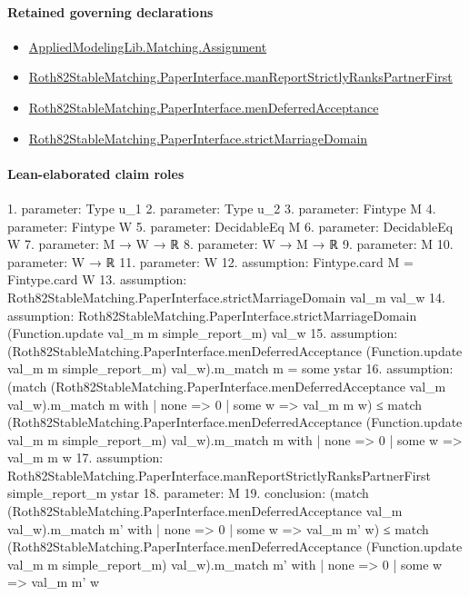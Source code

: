 \documentclass[10pt]{article}
\begin{document}
\paragraph{Retained governing declarations}
\begin{itemize}\raggedright
\item \hyperlink{governing-declaration-508c084086b006b8}{Applied\allowbreak{}Modeling\allowbreak{}Lib.\allowbreak{}Matching.\allowbreak{}Assignment}
\item \hyperlink{paper-prerequisite-bcdb1d603a6bc29f}{Roth82\allowbreak{}Stable\allowbreak{}Matching.\allowbreak{}Paper\allowbreak{}Interface.\allowbreak{}man\allowbreak{}Report\allowbreak{}Strictly\allowbreak{}Ranks\allowbreak{}Partner\allowbreak{}First}
\item \hyperlink{governing-declaration-7357e0557237bc7e}{Roth82\allowbreak{}Stable\allowbreak{}Matching.\allowbreak{}Paper\allowbreak{}Interface.\allowbreak{}men\allowbreak{}Deferred\allowbreak{}Acceptance}
\item \hyperlink{governing-declaration-d06ec2a2987f0c72}{Roth82\allowbreak{}Stable\allowbreak{}Matching.\allowbreak{}Paper\allowbreak{}Interface.\allowbreak{}strict\allowbreak{}Marriage\allowbreak{}Domain}
\end{itemize}
\paragraph{Lean-elaborated claim roles}\begin{ReviewVerbatim}
1. parameter: Type u_1
2. parameter: Type u_2
3. parameter: Fintype M
4. parameter: Fintype W
5. parameter: DecidableEq M
6. parameter: DecidableEq W
7. parameter: M → W → ℝ
8. parameter: W → M → ℝ
9. parameter: M
10. parameter: W → ℝ
11. parameter: W
12. assumption: Fintype.card M = Fintype.card W
13. assumption: Roth82StableMatching.PaperInterface.strictMarriageDomain val_m val_w
14. assumption: Roth82StableMatching.PaperInterface.strictMarriageDomain (Function.update val_m m simple_report_m) val_w
15. assumption: (Roth82StableMatching.PaperInterface.menDeferredAcceptance (Function.update val_m m simple_report_m) val_w).m_match m =
  some ystar
16. assumption: (match (Roth82StableMatching.PaperInterface.menDeferredAcceptance val_m val_w).m_match m with
  | none => 0
  | some w => val_m m w) ≤
  match
    (Roth82StableMatching.PaperInterface.menDeferredAcceptance (Function.update val_m m simple_report_m) val_w).m_match
      m with
  | none => 0
  | some w => val_m m w
17. assumption: Roth82StableMatching.PaperInterface.manReportStrictlyRanksPartnerFirst simple_report_m ystar
18. parameter: M
19. conclusion: (match (Roth82StableMatching.PaperInterface.menDeferredAcceptance val_m val_w).m_match m' with
  | none => 0
  | some w => val_m m' w) ≤
  match
    (Roth82StableMatching.PaperInterface.menDeferredAcceptance (Function.update val_m m simple_report_m) val_w).m_match
      m' with
  | none => 0
  | some w => val_m m' w
\end{ReviewVerbatim}
\end{document}
